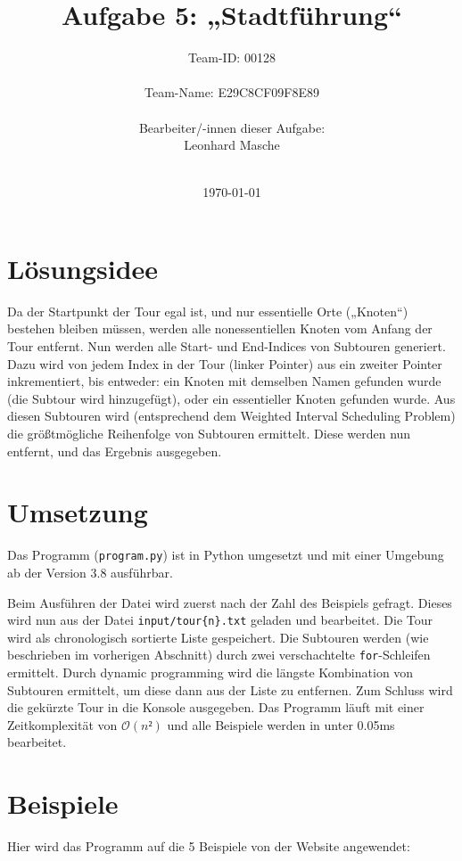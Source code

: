 \documentclass[a4paper,12pt]{scrartcl}
\title{\textbf{\Huge Aufgabe 5: „Stadtführung“}}
\author{\LARGE Team-ID: \LARGE 00128 \\\\
	    \LARGE Team-Name: \LARGE E29C8CF09F8E89 \\\\
	    \LARGE Bearbeiter/-innen dieser Aufgabe: \\ 
	    \LARGE Leonhard Masche\\\\}
\date{\LARGE\today}
\newcommand{\pyinline}[1]{\texttt{#1}}
\theoremstyle{definition}
\begin{document}
\maketitle
\tableofcontents
\section{Lösungsidee}

Da der Startpunkt der Tour egal ist, und nur essentielle Orte („Knoten“)
bestehen bleiben müssen, werden alle nonessentiellen Knoten vom Anfang der Tour
entfernt. Nun werden alle Start- und End-Indices von Subtouren generiert. Dazu
wird von jedem Index in der Tour (linker Pointer) aus ein zweiter Pointer
inkrementiert, bis entweder: ein Knoten mit demselben Namen gefunden wurde (die
Subtour wird hinzugefügt), oder ein essentieller Knoten gefunden wurde. Aus
diesen Subtouren wird (entsprechend dem Weighted Interval Scheduling Problem)
die größtmögliche Reihenfolge von Subtouren ermittelt. Diese werden nun
entfernt, und das Ergebnis ausgegeben.

\section{Umsetzung}

Das Programm (\texttt{program.py}) ist in Python umgesetzt und mit einer
Umgebung ab der Version 3.8 ausführbar.

Beim Ausführen der Datei wird zuerst nach der Zahl des Beispiels gefragt. Dieses
wird nun aus der Datei \texttt{input/tour\{n\}.txt} geladen und bearbeitet. Die
Tour wird als chronologisch sortierte Liste gespeichert. Die Subtouren werden
(wie beschrieben im vorherigen Abschnitt) durch zwei verschachtelte
\pyinline{for}-Schleifen ermittelt. Durch dynamic programming wird die längste
Kombination von Subtouren ermittelt, um diese dann aus der Liste zu entfernen.
 Zum Schluss wird die
gekürzte Tour in die Konsole ausgegeben. Das Programm läuft mit einer
Zeitkomplexität von $\mathcal{O}(n²)$ und alle Beispiele werden in unter 0.05ms
bearbeitet.

\section{Beispiele}

Hier wird das Programm auf die 5 Beispiele von der Website angewendet:
\end{document}
